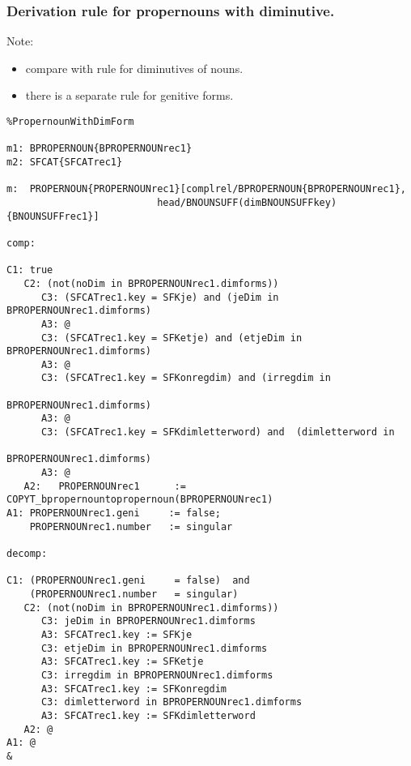 \subsubsection{Derivation rule for propernouns with diminutive.}
Note: 
\begin{itemize}
  \item compare with rule for diminutives of nouns.
  \item there is a separate rule for genitive forms.
\end{itemize}
\begin{verbatim}
%PropernounWithDimForm

m1: BPROPERNOUN{BPROPERNOUNrec1}
m2: SFCAT{SFCATrec1}

m:  PROPERNOUN{PROPERNOUNrec1}[complrel/BPROPERNOUN{BPROPERNOUNrec1}, 
                          head/BNOUNSUFF(dimBNOUNSUFFkey){BNOUNSUFFrec1}]

comp:

C1: true
   C2: (not(noDim in BPROPERNOUNrec1.dimforms))
      C3: (SFCATrec1.key = SFKje) and (jeDim in BPROPERNOUNrec1.dimforms)
      A3: @
      C3: (SFCATrec1.key = SFKetje) and (etjeDim in BPROPERNOUNrec1.dimforms)  
      A3: @
      C3: (SFCATrec1.key = SFKonregdim) and (irregdim in 
                                                    BPROPERNOUNrec1.dimforms)
      A3: @
      C3: (SFCATrec1.key = SFKdimletterword) and  (dimletterword in
                                                    BPROPERNOUNrec1.dimforms)
      A3: @
   A2:   PROPERNOUNrec1      := COPYT_bpropernountopropernoun(BPROPERNOUNrec1)
A1: PROPERNOUNrec1.geni     := false;
    PROPERNOUNrec1.number   := singular

decomp:

C1: (PROPERNOUNrec1.geni     = false)  and
    (PROPERNOUNrec1.number   = singular)
   C2: (not(noDim in BPROPERNOUNrec1.dimforms))
      C3: jeDim in BPROPERNOUNrec1.dimforms
      A3: SFCATrec1.key := SFKje
      C3: etjeDim in BPROPERNOUNrec1.dimforms
      A3: SFCATrec1.key := SFKetje
      C3: irregdim in BPROPERNOUNrec1.dimforms
      A3: SFCATrec1.key := SFKonregdim
      C3: dimletterword in BPROPERNOUNrec1.dimforms
      A3: SFCATrec1.key := SFKdimletterword
   A2: @
A1: @
&
\end{verbatim}
\newpage
